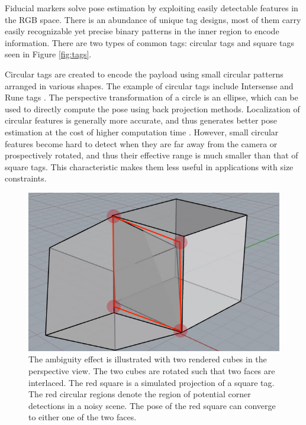 	Fiducial markers solve pose estimation by exploiting easily detectable features in the RGB space. There is an abundance of unique tag designs, most of them carry easily recognizable yet precise binary patterns in the inner region to encode information. There are two types of common tags: circular tags and square tags seen in Figure \ref{fig:tags}. 
	
	Circular tags are created to encode the payload using small circular patterns arranged in various shapes. The example of circular tags include Intersense \citep{naimark2002circular} and Rune tags \citep{bergamasco2011rune}. The perspective transformation of a circle is an ellipse, which can be used to directly compute the pose using back projection methods. Localization of circular features is generally more accurate, and thus generates better pose estimation at the cost of higher computation time \citep{rice2006analysing}. However, small circular features become hard to detect when they are far away from the camera or prospectively rotated, and thus their effective range is much smaller than that of square tags. This characteristic makes them less useful in applications with size constraints. 
	
\begin{figure}
\centering
\includegraphics[width=\columnwidth]{figs/perspective_fig}
\caption{The ambiguity effect is illustrated with two rendered cubes in the perspective view. The two cubes are rotated such that two faces are interlaced. The red square is a simulated projection of a square tag. The red circular regions denote the region of potential corner detections in a noisy scene. The pose of the red square can converge to either one of the two faces.}
\label{fig:cube}
\end{figure}
	
